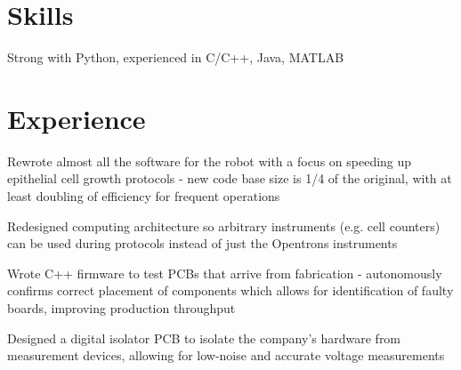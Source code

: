 \documentclass[]{deedy-resume-openfont}
\begin{document}

\section{Skills}
\begin{minipage}[t]{\textwidth}
	 \quad Strong with Python, experienced in C/C++, Java, MATLAB\\
	\runsubsection{}
	\vspace{8pt}
\end{minipage}


\section{Experience}

\begin{tightemize}
    \item Rewrote almost all the software for the robot with a focus on speeding up epithelial cell growth protocols - new code base size is 1/4 of the original, with at least doubling of efficiency for frequent operations
    \item Redesigned computing architecture so arbitrary instruments (e.g. cell counters) can be used during protocols instead of just the Opentrons instruments
\end{tightemize}

\vspace{8pt}

\begin{tightemize}
    \item Wrote C++ firmware to test PCBs that arrive from fabrication - autonomously confirms correct placement of components which allows for identification of faulty boards, improving production throughput
    \item Designed a digital isolator PCB to isolate the company's hardware from measurement devices, allowing for low-noise and accurate voltage measurements
\end{tightemize}
\end{document}
